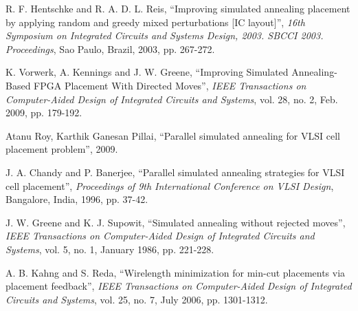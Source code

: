 \documentclass[conference]{IEEEtran}
\begin{document}
\begin{thebibliography}{00}
 R. F. Hentschke and R. A. D. L. Reis, ``Improving simulated annealing placement by applying random and greedy mixed perturbations [IC layout]'', \textit{16th Symposium on Integrated Circuits and Systems Design, 2003. SBCCI 2003. Proceedings}, Sao Paulo, Brazil, 2003, pp. 267-272.

 K. Vorwerk, A. Kennings and J. W. Greene, ``Improving Simulated Annealing-Based FPGA Placement With Directed Moves'', \textit{IEEE Transactions on Computer-Aided Design of Integrated Circuits and Systems}, vol. 28, no. 2, Feb. 2009, pp. 179-192.

 Atanu Roy, Karthik Ganesan Pillai, ``Parallel simulated annealing for VLSI
cell placement problem'', 2009.

 J. A. Chandy and P. Banerjee, ``Parallel simulated annealing strategies for VLSI cell placement'', \textit{Proceedings of 9th International Conference on VLSI Design}, Bangalore, India, 1996, pp. 37-42.

 J. W. Greene and K. J. Supowit, ``Simulated annealing without rejected moves'', \textit{IEEE Transactions on Computer-Aided Design of Integrated Circuits and Systems}, vol. 5, no. 1, January 1986, pp. 221-228.

 A. B. Kahng and S. Reda, ``Wirelength minimization for min-cut placements via placement feedback'', \textit{IEEE Transactions on Computer-Aided Design of Integrated Circuits and Systems}, vol. 25, no. 7, July 2006, pp. 1301-1312.

\end{thebibliography}
\end{document}
